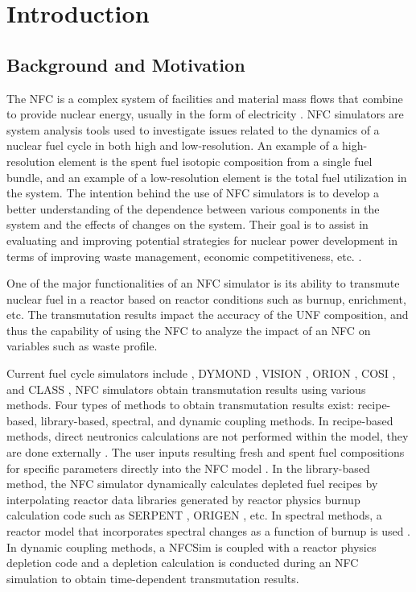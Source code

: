 \section{Introduction}



\subsection{Background and Motivation}
The \gls{NFC} is a complex system of facilities and material 
mass flows that combine to provide nuclear energy, usually in the form of electricity 
\cite{yacout_modeling_2005}. 
\gls{NFC} simulators are system analysis tools used to investigate 
issues related to the dynamics of a nuclear fuel cycle in both 
high and low-resolution. 
An example of a high-resolution element is the spent fuel 
isotopic composition from a single fuel bundle, and an example 
of a low-resolution element is the total fuel utilization in 
the system. 
The intention behind the use of \gls{NFC} simulators is to develop 
a better understanding of the dependence between various components 
in the system and the effects of changes on the system. 
Their goal is to assist in evaluating and improving potential 
strategies for nuclear power development in terms of improving waste 
management, economic competitiveness, etc. \cite{yacout_modeling_2005}.   

One of the major functionalities of an \gls{NFC} simulator is its 
ability to transmute nuclear fuel in a reactor based on reactor 
conditions such as burnup, enrichment, etc. 
The transmutation results impact the accuracy of the \gls{UNF} 
composition, and thus the capability of using the \gls{NFC} to 
analyze the impact of an \gls{NFC} on variables such as waste profile.  

Current fuel cycle simulators include 
\Cyclus \cite{huff_fundamental_2016},
DYMOND \cite{yacout_modeling_2005},
VISION \cite{jacobson_verifiable_2010},
ORION \cite{gregg_analysis_2012}, 
COSI \cite{coquelet-pascal_cosi6:_2015}, 
and CLASS \cite{mouginot_class_2012}, 
NFC simulators obtain transmutation results using 
various methods.  
Four types of methods to obtain transmutation 
results exist: recipe-based, library-based, spectral, and dynamic 
coupling methods. 
In recipe-based methods, direct neutronics calculations are not performed 
within the model, they are done externally \cite{yacout_vision_2006}. 
The user inputs resulting fresh and spent fuel compositions for specific 
parameters directly into the \gls{NFC} model \cite{sunny_transition_2015}. 
In the library-based method,  the \gls{NFC} simulator dynamically 
calculates depleted fuel recipes by interpolating reactor data libraries 
generated by reactor physics burnup calculation code such as SERPENT 
\cite{leppanen_serpent_2013}, \gls{ORIGEN} \cite{croff_users_1980}, etc. 
In spectral methods, a reactor model that incorporates spectral 
changes as a function of burnup is used \cite{scopatz_essential_2011}. 
In dynamic coupling methods, a \gls{NFCSim} is coupled with a reactor 
physics depletion code and a depletion calculation is conducted 
during an \gls{NFC} simulation to obtain time-dependent 
transmutation results. 

